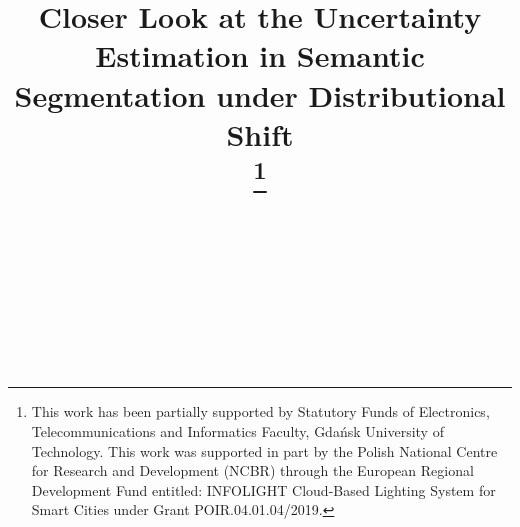 \documentclass[conference]{IEEEtran}
\begin{document}
\title{Closer Look at the Uncertainty Estimation in Semantic Segmentation under Distributional Shift\\
\thanks{This work has been partially supported by Statutory Funds of Electronics, Telecommunications and Informatics Faculty, Gdańsk University of Technology. This work was supported in part by the Polish National Centre for Research and Development (NCBR) through the European Regional Development Fund entitled: INFOLIGHT Cloud-Based Lighting System for Smart Cities under Grant POIR.04.01.04/2019.}
}


\author{
\\
\and
{}
\\
{}
 \\
\and
{}
 \\
 \\

}

\maketitle

\maketitle
\begingroup\renewcommand\thefootnote{\textsection}
\endgroup
\end{document}
